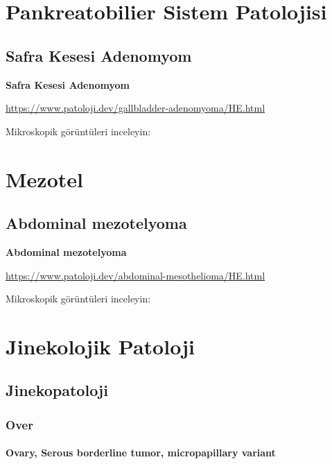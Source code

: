 \documentclass[
  letterpaper,
  DIV=11,
  numbers=noendperiod]{scrreprt}
\begin{document}
\part{Pankreatobilier Sistem Patolojisi}

\hypertarget{safra-kesesi-adenomyom}{%
\chapter{Safra Kesesi Adenomyom}\label{safra-kesesi-adenomyom}}

\textbf{Safra Kesesi Adenomyom}

\url{https://www.patoloji.dev/gallbladder-adenomyoma/HE.html}

Mikroskopik görüntüleri inceleyin:

\part{Mezotel}

\hypertarget{abdominal-mezotelyoma}{%
\chapter{Abdominal mezotelyoma}\label{abdominal-mezotelyoma}}

\textbf{Abdominal mezotelyoma}

\url{https://www.patoloji.dev/abdominal-mesothelioma/HE.html}

Mikroskopik görüntüleri inceleyin:

\part{Jinekolojik Patoloji}

\hypertarget{jinekopatoloji}{%
\chapter{Jinekopatoloji}\label{jinekopatoloji}}

\hypertarget{over}{%
\section{Over}\label{over}}

\hypertarget{ovary-serous-borderline-tumor-micropapillary-variant}{%
\subsection{Ovary, Serous borderline tumor, micropapillary
variant}\label{ovary-serous-borderline-tumor-micropapillary-variant}}
\end{document}
